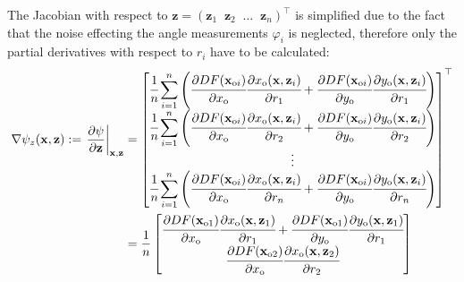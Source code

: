 The Jacobian with respect to $\mathbf{z} = (\mathbf{z}_1\;\;\mathbf{z}_2\;\; \dots \;\; \mathbf{z}_n)^{\top}$ is simplified due to the fact that the noise effecting the
angle measurements $\varphi_i$ is neglected, therefore only the partial derivatives with respect to $r_i$ have to
be calculated:
\begin{align}\label{eq:measmodel-jacobi-z}
    \nabla\psi_z(\mathbf{x},\mathbf{z}) := \left.\frac{\partial\psi}{\partial \mathbf{z}}\right\vert_{\mathbf{x},\mathbf{z}}
     & =
    \begin{bmatrix}
        \cfrac{1}{n}\displaystyle\sum\limits_{i=1}^{n}\left(\cfrac{\partial DF(\mathbf{x}_{\text{o}i})}{\partial x_{\text{o}}}\cfrac{\partial x_{\text{o}}(\mathbf{x},\mathbf{z}_i)}{\partial r_1}
        + \cfrac{\partial DF(\mathbf{x}_{\text{o}i})}{\partial y_{\text{o}}}\cfrac{\partial y_{\text{o}}(\mathbf{x},\mathbf{z}_i)}{\partial r_1}\right) \\
        \cfrac{1}{n}\displaystyle\sum\limits_{i=1}^{n}\left(\cfrac{\partial DF(\mathbf{x}_{\text{o}i})}{\partial x_{\text{o}}}\cfrac{\partial x_{\text{o}}(\mathbf{x},\mathbf{z}_i)}{\partial r_2}
        + \cfrac{\partial DF(\mathbf{x}_{\text{o}i})}{\partial y_{\text{o}}}\cfrac{\partial y_{\text{o}}(\mathbf{x},\mathbf{z}_i)}{\partial r_2}\right) \\
        \vdots                                                                                                                                          \\
        \cfrac{1}{n}\displaystyle\sum\limits_{i=1}^{n}\left(\cfrac{\partial DF(\mathbf{x}_{\text{o}i})}{\partial x_{\text{o}}}\cfrac{\partial x_{\text{o}}(\mathbf{x},\mathbf{z}_i)}{\partial r_n}
        + \cfrac{\partial DF(\mathbf{x}_{\text{o}i})}{\partial y_{\text{o}}}\cfrac{\partial y_{\text{o}}(\mathbf{x},\mathbf{z}_i)}{\partial r_n}\right) \\
    \end{bmatrix}^{\top} \nonumber \\
     & =
    \frac{1}{n}
    \begin{bmatrix}
        \cfrac{\partial DF(\mathbf{x}_{\text{o}1})}{\partial x_{\text{o}}}\cfrac{\partial x_{\text{o}}(\mathbf{x},\mathbf{z}_1)}{\partial r_1}
        + \cfrac{\partial DF(\mathbf{x}_{\text{o}1})}{\partial y_{\text{o}}}\cfrac{\partial y_{\text{o}}(\mathbf{x},\mathbf{z}_1)}{\partial r_1} \\
        \cfrac{\partial DF(\mathbf{x}_{\text{o}2})}{\partial x_{\text{o}}}\cfrac{\partial x_{\text{o}}(\mathbf{x},\mathbf{z}_2)}{\partial r_2}

\end{bmatrix}
\end{align}

